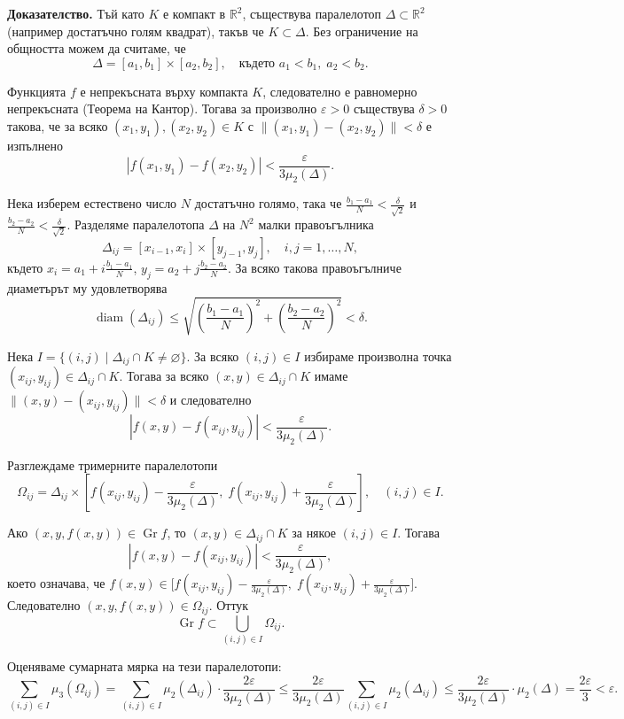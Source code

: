 \documentclass[10pt]{article}
\begin{document}
\textbf{Доказателство.} 
Тъй като $K$ е компакт в $\mathbb{R}^2$, съществува паралелотоп $\Delta \subset \mathbb{R}^2$ (например достатъчно голям квадрат), такъв че $K \subset \Delta$. Без ограничение на общността можем да считаме, че
\[
\Delta = [a_1,b_1] \times [a_2,b_2], \quad \text{където } a_1 < b_1,\; a_2 < b_2.
\]

Функцията $f$ е непрекъсната върху компакта $K$, следователно е равномерно непрекъсната (Теорема на Кантор). Тогава за произволно $\varepsilon > 0$ съществува $\delta > 0$ такова, че за всяко $(x_1,y_1),(x_2,y_2) \in K$ с $\|(x_1,y_1)-(x_2,y_2)\| < \delta$ е изпълнено
\[
|f(x_1,y_1) - f(x_2,y_2)| < \frac{\varepsilon}{3\mu_2(\Delta)}.
\]

Нека изберем естествено число $N$ достатъчно голямо, така че $\frac{b_1-a_1}{N} < \frac{\delta}{\sqrt{2}}$ и $\frac{b_2-a_2}{N} < \frac{\delta}{\sqrt{2}}$. Разделяме паралелотопа $\Delta$ на $N^2$ малки правоъгълника
\[
\Delta_{ij} = [x_{i-1}, x_i] \times [y_{j-1}, y_j], \quad i,j = 1,\dots,N,
\]
където $x_i = a_1 + i\frac{b_1-a_1}{N}$, $y_j = a_2 + j\frac{b_2-a_2}{N}$. За всяко такова правоъгълниче диаметърът му удовлетворява
\[
\operatorname{diam}(\Delta_{ij}) \le \sqrt{\left(\frac{b_1-a_1}{N}\right)^2 + \left(\frac{b_2-a_2}{N}\right)^2} < \delta.
\]

Нека $I = \{ (i,j) \mid \Delta_{ij} \cap K \neq \varnothing \}$. За всяко $(i,j) \in I$ избираме произволна точка $(x_{ij}, y_{ij}) \in \Delta_{ij} \cap K$. Тогава за всяко $(x,y) \in \Delta_{ij} \cap K$ имаме $\|(x,y)-(x_{ij},y_{ij})\| < \delta$ и следователно
\[
|f(x,y) - f(x_{ij},y_{ij})| < \frac{\varepsilon}{3\mu_2(\Delta)}.
\]

Разглеждаме тримерните паралелотопи
\[
\Omega_{ij} = \Delta_{ij} \times \left[ f(x_{ij},y_{ij}) - \frac{\varepsilon}{3\mu_2(\Delta)},\; f(x_{ij},y_{ij}) + \frac{\varepsilon}{3\mu_2(\Delta)} \right], \quad (i,j) \in I.
\]

Ако $(x,y,f(x,y)) \in \operatorname{Gr}f$, то $(x,y) \in \Delta_{ij} \cap K$ за някое $(i,j) \in I$. Тогава
\[
|f(x,y) - f(x_{ij},y_{ij})| < \frac{\varepsilon}{3\mu_2(\Delta)},
\]
което означава, че $f(x,y) \in \bigl[ f(x_{ij},y_{ij}) - \frac{\varepsilon}{3\mu_2(\Delta)},\; f(x_{ij},y_{ij}) + \frac{\varepsilon}{3\mu_2(\Delta)} \bigr]$. Следователно $(x,y,f(x,y)) \in \Omega_{ij}$. Оттук
\[
\operatorname{Gr}f \subset \bigcup_{(i,j)\in I} \Omega_{ij}.
\]

Оценяваме сумарната мярка на тези паралелотопи:
\[
\sum_{(i,j)\in I} \mu_3(\Omega_{ij}) = \sum_{(i,j)\in I} \mu_2(\Delta_{ij}) \cdot \frac{2\varepsilon}{3\mu_2(\Delta)} \le \frac{2\varepsilon}{3\mu_2(\Delta)} \sum_{(i,j)\in I} \mu_2(\Delta_{ij}) \le \frac{2\varepsilon}{3\mu_2(\Delta)} \cdot \mu_2(\Delta) = \frac{2\varepsilon}{3} < \varepsilon.
\]
\end{document}
